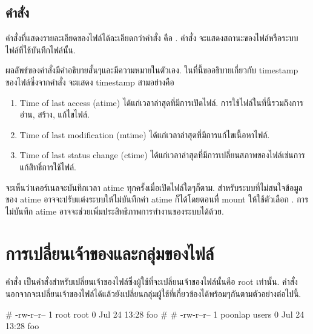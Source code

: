 \begin{thwbr}
\subsection{คำสั่ง }
คำสั่งที่แสดงรายละเอียดของไฟล์ได้ละเอียดกว่าคำสั่ง  คือ . คำสั่ง  จะแสดงสถานะของไฟล์หรือระบบไฟล์ที่ใช้บันทึกไฟล์นั้น. 
\begin{MyExample}
\end{MyExample}%
ผลลัพธ์ของคำสั่งมีคำอธิบายสั้นๆและมีความหมายในตัวเอง. ในที่นี้ขออธิบายเกี่ยวกับ timestamp ของไฟล์ซึ่งจากคำสั่ง  จะแสดง timestamp สามอย่างคือ
\begin{enumerate}
\item Time of last access (atime) ได้แก่เวลาล่าสุดที่มีการเปิดไฟล์. การใช้ไฟล์ในที่นี้รวมถึงการอ่าน, สร้าง, แก้ไขไฟล์.
\item Time of last modification (mtime) ได้แก่เวลาล่าสุดที่มีการแก้ไขเนื้อหาไฟล์. 
\item Time of last status change (ctime) ได้แก่เวลาล่าสุดที่มีการเปลี่ยนสภาพของไฟล์เช่นการแก้สิทธิ์การใช้ไฟล์.
\end{enumerate}

จะเห็นว่าเคอร์เนลจะบันทึกเวลา atime ทุกครั้งเมื่อเปิดไฟล์ใดๆก็ตาม. สำหรับระบบที่ไม่สนใจข้อมูลของ atime อาจจะปรับแต่งระบบให้ไม่บันทึกค่า atime ก็ได้โดยตอนที่ mount ให้ใช้ตัวเลือก . การไม่บันทึก atime อาจจะช่วยเพิ่มประสิทธิภาพการทำงานของระบบได้ด้วย.


\section{การเปลี่ยนเจ้าของและกลุ่มของไฟล์}
คำสั่ง  เป็นคำสั่งสำหรับเปลี่ยนเจ้าของไฟล์ซึ่งผู้ใช้ที่จะเปลี่ยนเจ้าของไฟล์นั้นคือ root เท่านั้น. คำสั่ง  นอกจากจะเปลี่ยนเจ้าของไฟล์ได้แล้วยังเปลี่ยนกลุ่มผู้ใช้ที่เกี่ยวข้องได้พร้อมๆกันตามตัวอย่างต่อไปนี้.
\begin{MyExample}
\begin{MyEx}
# 
-rw-r--r--    1 root     root            0 Jul 24 13:28 foo
# 
# 
-rw-r--r--    1 poonlap  users           0 Jul 24 13:28 foo
\end{MyEx}
\end{MyExample}


\end{thwbr}
